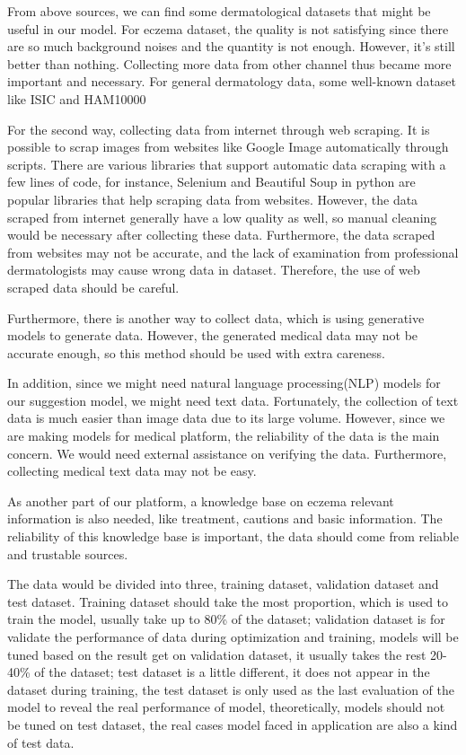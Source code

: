                 From above sources, we can find some dermatological datasets that might be useful in our model. For eczema dataset, the quality is not satisfying since there are so much background noises and the quantity is not enough. However, it's still better than nothing. Collecting more data from other channel thus became more important and necessary. For general dermatology data, some well-known dataset like ISIC and HAM10000\cite{DVN/DBW86T_2018}

                For the second way, collecting data from internet through web scraping. It is possible to scrap images from websites like Google Image automatically through scripts. There are various libraries that support automatic data scraping with a few lines of code, for instance, Selenium and Beautiful Soup in python are popular libraries that help scraping data from websites. However, the data scraped from internet generally have a low quality as well, so manual cleaning would be necessary after collecting these data. Furthermore, the data scraped from websites may not be accurate, and the lack of examination from professional dermatologists may cause wrong data in dataset. Therefore, the use of web scraped data should be careful.

                Furthermore, there is another way to collect data, which is using generative models to generate data. However, the generated medical data may not be accurate enough, so this method should be used with extra careness.

                In addition, since we might need natural language processing(NLP) models for our suggestion model, we might need text data. Fortunately, the collection of text data is much easier than image data due to its large volume. However, since we are making models for medical platform, the reliability of the data is the main concern. We would need external assistance on verifying the data. Furthermore, collecting medical text data may not be easy.

                As another part of our platform, a knowledge base on eczema relevant information is also needed, like treatment, cautions and basic information. The reliability of this knowledge base is important, the data should come from reliable and trustable sources.

                The data would be divided into three, training dataset, validation dataset and test dataset. Training dataset should take the most proportion, which is used to train the model, usually take up to 80\% of the dataset; validation dataset is for validate the performance of data during optimization and training, models will be tuned based on the result get on validation dataset, it usually takes the rest 20-40\% of the dataset; test dataset is a little different, it does not appear in the dataset during training, the test dataset is only used as the last evaluation of the model to reveal the real performance of model, theoretically, models should not be tuned on test dataset, the real cases model faced in application are also a kind of test data.

